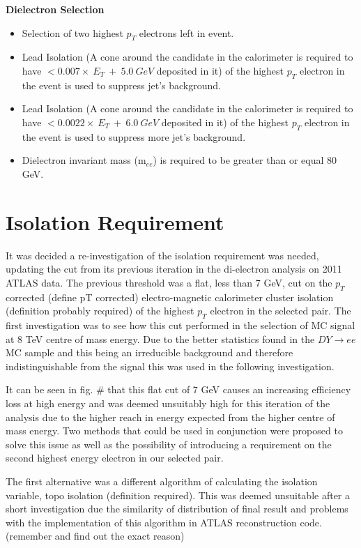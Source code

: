 {\bf Dielectron Selection}
\begin{itemize}
\item Selection of two highest $p_{T}$ electrons left in event.
\item Lead Isolation (A cone around the candidate in the calorimeter is required to have $< 0.007\times~E_{T}~+~5.0~GeV$ deposited in it) of the highest $p_{T}$ electron in the event is used to suppress jet's background. 
\item Lead Isolation (A cone around the candidate in the calorimeter is required to have $< 0.0022\times~E_{T}~+~6.0~GeV$ deposited in it) of the highest $p_{T}$ electron in the event is used to suppress more jet's background. 
\item Dielectron invariant mass (m$_{ee}$) is required to be greater than or equal 80 GeV.
\end{itemize}



\section{Isolation Requirement}

It was decided a re-investigation of the isolation requirement was needed, updating the cut from its previous iteration in the di-electron analysis on 2011 ATLAS data. The previous threshold was a flat, less than 7 GeV, cut on the $p_{T}$ corrected (define pT corrected) electro-magnetic calorimeter cluster isolation (definition probably required) of the highest $p_{T}$ electron in the selected pair. The first investigation was to see how this cut performed in the selection of MC signal at 8 TeV centre of mass energy. Due to the better statistics found in the $DY{\rightarrow}ee$ MC sample and this being an irreducible background and therefore indistinguishable from the signal this was used in the following investigation.

It can be seen in fig. \# that this flat cut of 7 GeV causes an increasing efficiency loss at high energy and was deemed unsuitably high for this iteration of the analysis due to the higher reach in energy expected from the higher centre of mass energy. Two methods that could be used in conjunction were proposed to solve this issue as well as the possibility of introducing a requirement on the second highest energy electron in our selected pair.

The first alternative was a different algorithm of calculating the isolation variable, topo isolation (definition required). This was deemed unsuitable after a short investigation due the similarity of distribution of final result and problems with the implementation of this algorithm in ATLAS reconstruction code. (remember and find out the exact reason)

